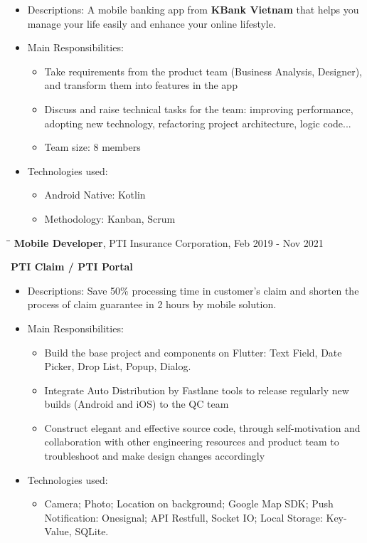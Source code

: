 \documentclass[margin, 10pt]{res}
\begin{document}
\begin{resume}
	\begin{itemize}
		\item Descriptions: A mobile banking app from {\bf KBank Vietnam} that helps you manage your life easily and enhance your online lifestyle.
		\item Main Responsibilities:
		\begin{itemize}
   			\item Take requirements from the product team (Business Analysis, Designer), and transform them into features in the app
   			\item Discuss and raise technical tasks for the team: improving performance, adopting new technology, refactoring project architecture, logic code...
   			\item Team size: 8 members 
		\end{itemize}
			\item Technologies used:
		\begin{itemize}
			\item Android Native: Kotlin
			\item Methodology: Kanban, Scrum
		\end{itemize}
	\end{itemize}
   
   \begin{tabbing}
   \hspace{2.0in}\= \hspace{2.0in}\= \kill %
   {\large{\bf Mobile Developer}}, PTI Insurance Corporation, Feb 2019 - Nov 2021\\
   \end{tabbing}
	\vspace{-20pt} %
 	{\bf PTI Claim / PTI Portal}
   \begin{itemize}
   	\item Descriptions: Save 50\% processing time in customer’s claim and shorten the process of claim guarantee in 2 hours by mobile solution.
   	\item Main Responsibilities:
   	\begin{itemize}
   		\item Build the base project and components on Flutter: Text Field, Date Picker, Drop List, Popup, Dialog.
   		\item Integrate Auto Distribution by Fastlane tools to release regularly new builds (Android and iOS) to the QC team
   		\item Construct elegant and effective source code, through self-motivation and collaboration with other engineering resources 
		and product team to troubleshoot and make design changes accordingly
	\end{itemize}
	\item Technologies used:
	\begin{itemize}
		\item Camera; Photo; Location on background; Google Map SDK; Push Notification: Onesignal; API Restfull, Socket IO; Local Storage: Key-Value, SQLite.
	\end{itemize}
	

\end{itemize}
\end{resume}
\end{document}
